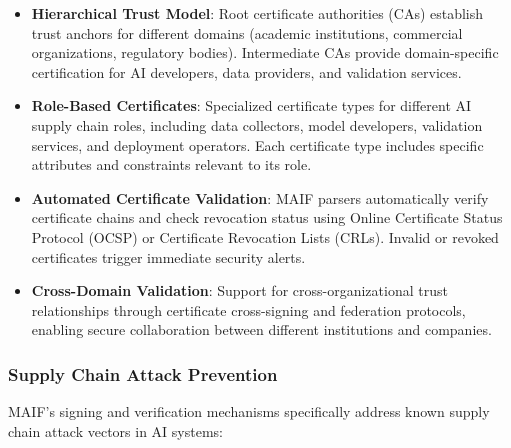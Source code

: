 \documentclass[conference]{IEEEtran}
\begin{document}
\begin{itemize}[leftmargin=*]
\item \textbf{Hierarchical Trust Model}: Root certificate authorities (CAs) establish trust anchors for different domains (academic institutions, commercial organizations, regulatory bodies). Intermediate CAs provide domain-specific certification for AI developers, data providers, and validation services.

\item \textbf{Role-Based Certificates}: Specialized certificate types for different AI supply chain roles, including data collectors, model developers, validation services, and deployment operators. Each certificate type includes specific attributes and constraints relevant to its role.

\item \textbf{Automated Certificate Validation}: MAIF parsers automatically verify certificate chains and check revocation status using Online Certificate Status Protocol (OCSP) or Certificate Revocation Lists (CRLs). Invalid or revoked certificates trigger immediate security alerts.

\item \textbf{Cross-Domain Validation}: Support for cross-organizational trust relationships through certificate cross-signing and federation protocols, enabling secure collaboration between different institutions and companies.
\end{itemize}

\subsubsection{Supply Chain Attack Prevention}

MAIF's signing and verification mechanisms specifically address known supply chain attack vectors in AI systems:
\end{document}
